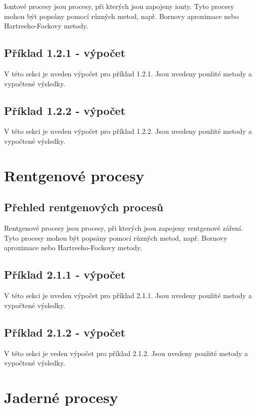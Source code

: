 \documentclass{article}
\begin{document}
Iontové procesy jsou procesy, při kterých jsou zapojeny ionty. Tyto procesy mohou být popsány pomocí různých metod, např. Bornovy aproximace nebo Hartreeho-Fockovy metody.

\subsection{Příklad 1.2.1 - výpočet}

V této sekci je uveden výpočet pro příklad 1.2.1. Jsou uvedeny použité metody a vypočtené výsledky.

\subsection{Příklad 1.2.2 - výpočet}

V této sekci je uveden výpočet pro příklad 1.2.2. Jsou uvedeny použité metody a vypočtené výsledky.

\section{Rentgenové procesy}

\subsection{Přehled rentgenových procesů}

Rentgenové procesy jsou procesy, při kterých jsou zapojeny rentgenové záření. Tyto procesy mohou být popsány pomocí různých metod, např. Bornovy aproximace nebo Hartreeho-Fockovy metody.

\subsection{Příklad 2.1.1 - výpočet}

V této sekci je uveden výpočet pro příklad 2.1.1. Jsou uvedeny použité metody a vypočtené výsledky.

\subsection{Příklad 2.1.2 - výpočet}

V této sekci je veden výpočet pro příklad 2.1.2. Jsou uvedeny použité metody a vypočtené výsledky.

\section{Jaderné procesy}
\end{document}
